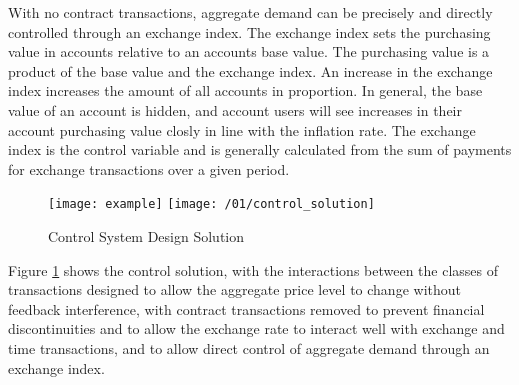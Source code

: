 With no contract transactions, aggregate demand can be precisely and directly controlled through an
exchange index.  The exchange index sets the purchasing value in accounts relative to an accounts
base value. The purchasing value is a product of the base value and the exchange index. An increase
in the exchange index increases the amount of all accounts in proportion. In general, the base value
of an account is hidden, and account users will see increases in their account purchasing value
closly in line with the inflation rate. The exchange index is the control variable and is generally
calculated from the sum of payments for exchange transactions over a given period.  

\begin{figure}
\centering
\texttt{[image: example]}
\texttt{[image: /01/control\_solution]}
\caption{Control System Design Solution}
\label{fig:control_solution}
\end{figure}

Figure \ref{fig:control_solution} shows the control solution, with the interactions between the
classes of transactions designed to allow the aggregate price level to change without feedback
interference, with contract transactions removed to prevent financial discontinuities and to allow
the exchange rate to interact well with exchange and time transactions, and to allow direct control
of aggregate demand through an exchange index.
